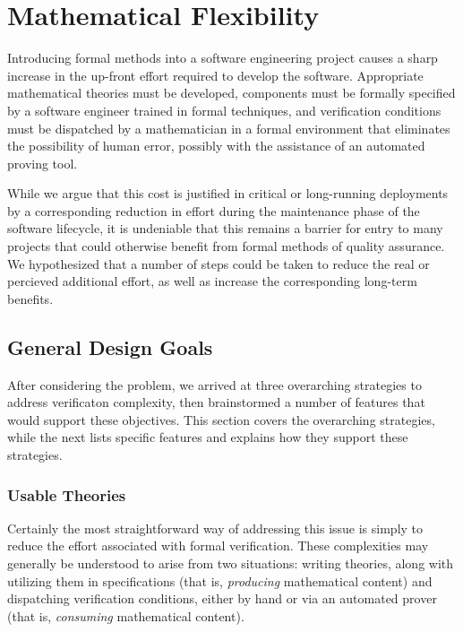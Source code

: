


\chapter{Mathematical Flexibility\label{ch:math}}

Introducing formal methods into a software engineering project causes a sharp increase in the up-front effort required to develop the software.  Appropriate mathematical theories must be developed, components must be formally specified by a software engineer trained in formal techniques, and verification conditions must be dispatched by a mathematician in a formal environment that eliminates the possibility of human error, possibly with the assistance of an automated proving tool.

While we argue that this cost is justified in critical or long-running deployments by a corresponding reduction in effort during the maintenance phase of the software lifecycle, it is undeniable that this remains a barrier for entry to many projects that could otherwise benefit from formal methods of quality assurance.  We hypothesized that a number of steps could be taken to reduce the real or percieved additional effort, as well as increase the corresponding long-term benefits.

\section{General Design Goals\label{mathDesignGoals}}

After considering the problem, we arrived at three overarching strategies to address verificaton complexity, then brainstormed a number of features that would support these objectives.  This section covers the overarching strategies, while the next lists specific features and explains how they support these strategies. 

	\subsection{Usable Theories\label{usableTheories}}

Certainly the most straightforward way of addressing this issue is simply to reduce the effort associated with formal verification.  These complexities may generally be understood to arise from two situations: writing theories, along with utilizing them in specifications (that is, \emph{producing} mathematical content) and dispatching verification conditions, either by hand or via an automated prover (that is, \emph{consuming} mathematical content).

